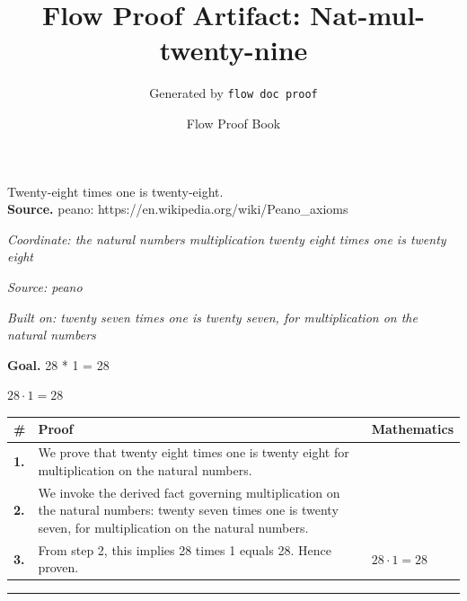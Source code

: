\documentclass[11pt]{article}
\title{Flow Proof Artifact: Nat-mul-twenty-nine}
\author{Generated by \texttt{flow doc proof}}
\date{Flow Proof Book}
\theoremstyle{definition}
\begin{document}
\maketitle
Twenty-eight times one is twenty-eight.\\[0.5em]
\textbf{Source.} peano: https://en.wikipedia.org/wiki/Peano\_axioms\\[0.5em]
\bigskip
{}\par
\smallskip\noindent\textit{Coordinate: the natural numbers \cdot multiplication \cdot twenty eight times one is twenty eight}\par
\smallskip\noindent\textit{Source: peano}\par
\smallskip\noindent\textit{Built on: twenty seven times one is twenty seven, for multiplication on the natural numbers}\par
\medskip
\noindent\textbf{Goal.} 28 * 1 = 28\par
\noindent$\displaystyle 28 \cdot 1 = 28$\par
\medskip
\noindent
\begin{tabular}{@{} >{\raggedright\arraybackslash}p{} >{\raggedright\arraybackslash}p{} >{\raggedleft\arraybackslash}p{} @{}}
\textbf{\#} & \textbf{Proof} & \textbf{Mathematics} \\
\midrule
\textbf{1.} & We prove that twenty eight times one is twenty eight for multiplication on the natural numbers. & \\[0.45em]
\textbf{2.} & We invoke the derived fact governing multiplication on the natural numbers: twenty seven times one is twenty seven, for multiplication on the natural numbers. & \\[0.45em]
\textbf{3.} & From step 2, this implies 28 times 1 equals 28. Hence proven. & $\displaystyle 28 \cdot 1 = 28$ \\[0.45em]
\bottomrule
\end{tabular}
\label{thm:Nat-multiplication-twenty_eight_times_one_is_twenty_eight}
\par\medskip\hrule
\end{document}
